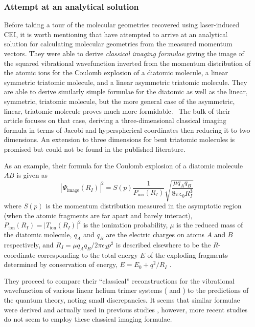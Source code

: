 \subsubsection*{Attempt at an analytical solution}
Before taking a tour of the molecular geometries recovered using laser-induced CEI, it is worth mentioning that \citet{Nagaya04} have attempted to arrive at an analytical solution for calculating molecular geometries from the measured momentum vectors. They were able to derive \emph{classical imaging formulae} giving the image of the squared vibrational wavefunction inverted from the momentum distribution of the atomic ions for the Coulomb explosion of a diatomic molecule, a linear symmetric triatomic molecule, and a linear asymmetric triatomic molecule. They are able to derive similarly simple formulae for the diatomic as well as the linear, symmetric, triatomic molecule, but the more general case of the asymmetric, linear, triatomic molecule proves much more formidable.\footnotemark~ The bulk of their article focuses on that case, deriving a three-dimensional classical imaging formula in terms of Jacobi and hyperspherical coordinates then reducing it to two dimensions. An extension to three dimensions for bent triatomic molecules is promised but could not be found in the published literature.

As an example, their formula for the Coulomb explosion of a diatomic molecule $AB$ is given as
\begin{equation}
|\Psi_\mathrm{image}(R_I)|^2 = S(p) \frac{1}{P_\mathrm{ion}(R_I)} \sqrt{\frac{\mu q_A q_B}{8\pi\epsilon_0 R_I^3}}
\end{equation}
where $S(p)$ is the momentum distribution measured in the asymptotic region (when the atomic fragments are far apart and barely interact), $P_\mathrm{ion}(R_I) = |T_\mathrm{ion}(R_I)|^2$ is the ionization probability, $\mu$ is the reduced mass of the diatomic molecule, $q_A$ and $q_B$ are the electric charges on atoms $A$ and $B$ respectively, and $R_I = \mu q_A q_B/2\pi\epsilon_0 p^2$ is described elsewhere to be the $R$-coordinate  corresponding to the total energy $E$ of the exploding fragments determined by conservation of energy, $E = E_0 + q^2/R_I$ \citep{Chelkowski02}.

They proceed to compare their ``classical'' reconstructions for the vibrational wavefunction of various linear helium trimer systems ( and ) to the predictions of the quantum theory, noting small discrepancies. It seems that similar formulae were derived and actually used in previous studies \citep{Bandrauk01, Chelkowski02}, however, more recent studies do not seem to employ these classical imaging formulae.

